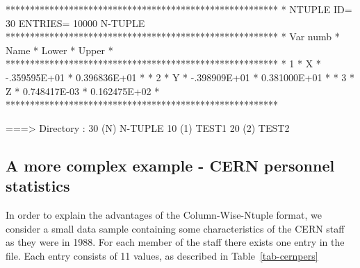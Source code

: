 \begin{Listing}
 ********************************************************
 * NTUPLE ID=   30  ENTRIES=  10000   N-TUPLE 
 ********************************************************
 *  Var numb  *   Name    *    Lower     *    Upper     *
 ********************************************************
 *      1     *    X      * -.359595E+01 * 0.396836E+01 *
 *      2     *    Y      * -.398909E+01 * 0.381000E+01 *
 *      3     *    Z      * 0.748417E-03 * 0.162475E+02 *
 ********************************************************

 ===> Directory : 
         30 (N)   N-TUPLE 
         10 (1)   TEST1   
         20 (2)   TEST2   
\end{Listing}

\subsection*{A more complex example - CERN personnel statistics}
\label{sec:ntuplestaff}

In order to explain the advantages of the Column-Wise-Ntuple format,
we consider a small data sample containing some characteristics of the CERN
staff as they were in 1988.
For each member of the staff there exists one entry in the file. Each
entry consists of 11 values, as described in Table~\ref{tab-cernpers}

